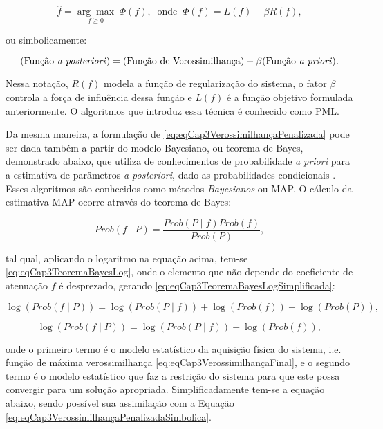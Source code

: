 {{\begin{equation}
\hat{f} = \underset{f\geq 0}{\arg\max} \; \Phi(f), \;\; \text{onde} \;\; \Phi(f) = L(f) - \beta R(f),
\label{eq:eqCap3VerossimilhançaPenalizada}
\end{equation}

\noindent ou simbolicamente:

\begin{equation}
(\text{Função \textit{a posteriori}}) = (\text{Função de Verossimilhança}) - \beta (\text{Função \textit{a priori}}).
\label{eq:eqCap3VerossimilhançaPenalizadaSimbolica}
\end{equation}

Nessa notação, $R(f)$ modela a função de regularização do sistema, o fator $\beta$ controla a força de influência dessa função e $L(f)$ é a função objetivo formulada anteriormente. O algoritmos que introduz essa técnica é conhecido como \ac{PML}. 

Da mesma maneira, a formulação de \eqref{eq:eqCap3VerossimilhançaPenalizada} pode ser dada também a partir do modelo Bayesiano, ou teorema de Bayes, demonstrado abaixo, que utiliza de conhecimentos de probabilidade \textit{a priori} para a estimativa de parâmetros \textit{a posteriori}, dado as probabilidades condicionais \cite[p. 144]{zeng2010medical}. Esses algoritmos são conhecidos como métodos \textit{Bayesianos} ou \ac{MAP}. O cálculo da estimativa \acs{MAP} ocorre através do teorema de Bayes:

\begin{equation}
Prob(f \mid P) = \dfrac{Prob(P \mid f) Prob(f)}{Prob(P)},
\label{eq:eqCap3TeoremaBayes}
\end{equation}  

\noindent tal qual,  aplicando o logaritmo na equação acima, tem-se \eqref{eq:eqCap3TeoremaBayesLog}, onde o elemento que não depende do coeficiente de atenuação $f$ é desprezado, gerando \eqref{eq:eqCap3TeoremaBayesLogSimplificada}:

\begin{equation}
\log(Prob(f \mid P)) = \log(Prob(P \mid f)) + \log(Prob(f)) - \log(Prob(P)),
\label{eq:eqCap3TeoremaBayesLog}
\end{equation}

\begin{equation}
\log(Prob(f \mid P)) = \log(Prob(P \mid f)) + \log(Prob(f)),
\label{eq:eqCap3TeoremaBayesLogSimplificada}
\end{equation}

\noindent onde o primeiro termo é o modelo estatístico da aquisição física do sistema, i.e. função de máxima verossimilhança \eqref{eq:eqCap3VerossimilhançaFinal}, e o segundo termo é o modelo estatístico que faz a restrição do sistema para que este possa convergir para um solução apropriada. Simplificadamente tem-se a equação abaixo, sendo possível sua assimilação com a Equação \ref{eq:eqCap3VerossimilhançaPenalizadaSimbolica}.

}}
